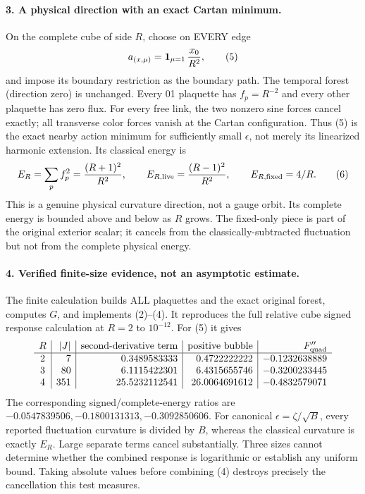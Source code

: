 \documentclass[11pt]{article}
\begin{document}
\paragraph{3. A physical direction with an exact Cartan minimum.}
On the complete cube of side $R$, choose on EVERY edge
\[
 a_{(x,\mu)}=\mathbf1_{\mu=1}\,{x_0\over R^2},                     \tag{5}
\]
and impose its boundary restriction as the boundary path. The temporal
forest (direction zero) is unchanged. Every 01 plaquette has
$f_p=R^{-2}$ and every other plaquette has zero flux. For every free link,
the two nonzero sine forces cancel exactly; all transverse color forces
vanish at the Cartan configuration. Thus (5) is the exact nearby action
minimum for sufficiently small $\epsilon$, not merely its linearized
harmonic extension. Its classical energy is
\[
 E_R=\sum_p f_p^2={(R+1)^2\over R^2},\qquad
 E_{R,\rm live}={(R-1)^2\over R^2},\qquad
 E_{R,\rm fixed}=4/R.                                               \tag{6}
\]
This is a genuine physical curvature direction, not a gauge orbit.
Its complete energy is bounded above and below as $R$ grows. The fixed-only
piece is part of the original exterior scalar; it cancels from the
classically-subtracted fluctuation but not from the complete physical energy.

\paragraph{4. Verified finite-size evidence, not an asymptotic estimate.}
The finite calculation builds ALL plaquettes and the exact original
forest, computes $G$, and implements (2)--(4). It reproduces
the full relative cube signed response calculation at $R=2$ to $10^{-12}$. For (5) it gives
\[
\begin{array}{c|r|r|r|r}
 R&|J|&\text{second-derivative term}&\text{positive bubble}&F''_{\rm quad}\\ \hline
 2&7&0.3489583333&0.4722222222&-0.1232638889\\
 3&80&6.1115422301&6.4315655746&-0.3200233445\\
 4&351&25.5232112541&26.0064691612&-0.4832579071
\end{array}
\]
The corresponding signed/complete-energy ratios are
$-0.0547839506,-0.1800131313,-0.3092850606$.
For canonical $\epsilon=\zeta/\sqrt B$, every reported fluctuation curvature
is divided by $B$, whereas the classical curvature is exactly $E_R$.
Large separate terms cancel substantially. Three sizes cannot determine
whether the combined response is logarithmic or establish any uniform
bound. Taking absolute values before combining (4) destroys precisely the
cancellation this test measures.
\end{document}
